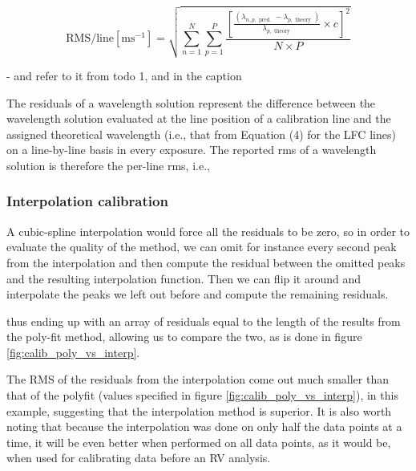     $$
        \text{RMS/line} \left[\mathrm{m} \mathrm{s}^{-1}\right]=\sqrt{\sum_{n=1}^{N} \sum_{p=1}^{P} \frac{\left[\frac{\left(\lambda_{n, p, \text { pred. }}-\lambda_{p, \text { theory }}\right)}{\lambda_{p, \text { theory }}} \times c\right]^{2}}{N \times P}}
    $$

    - and refer to it from todo 1, and in the caption
    
    
    The residuals of a wavelength solution represent the difference between the wavelength solution evaluated at the line position of a calibration line and the assigned theoretical wavelength (i.e., that from Equation (4) for the LFC lines) on a line-by-line basis in every exposure. The reported rms of a wavelength solution is therefore the per-line rms, i.e.,



    \subsubsection{Interpolation calibration}
    A cubic-spline interpolation would force all the residuals to be zero, so in order to evaluate the quality of the method, we can omit for instance every second peak from the interpolation and then compute the residual between the omitted peaks and the resulting interpolation function. Then we can flip it around and interpolate the peaks we left out before and compute the remaining residuals. 
    
    thus ending up with an array of residuals equal to the length of the results from the poly-fit method, allowing us to compare the two, as is done in figure \ref{fig:calib_poly_vs_interp}.

    The RMS of the residuals from the interpolation come out much smaller than that of the polyfit (values specified in figure \ref{fig:calib_poly_vs_interp}), in this example, suggesting that the interpolation method is superior. It is also worth noting that because the interpolation was done on only half the data points at a time, it will be even better when performed on all data points, as it would be, when used for calibrating data before an RV analysis.

